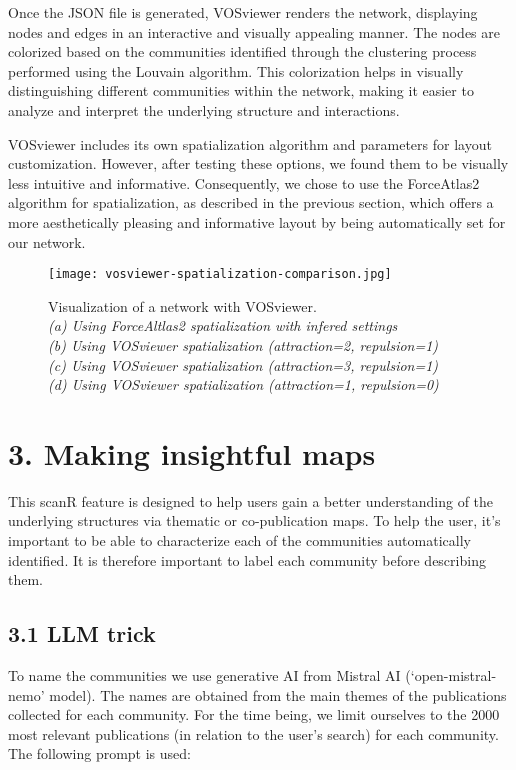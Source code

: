 \documentclass[
]{article}
\begin{document}
Once the JSON file is generated, VOSviewer renders the network,
displaying nodes and edges in an interactive and visually appealing
manner. The nodes are colorized based on the communities identified
through the clustering process performed using the Louvain algorithm.
This colorization helps in visually distinguishing different communities
within the network, making it easier to analyze and interpret the
underlying structure and interactions.

VOSviewer includes its own spatialization algorithm and parameters for
layout customization. However, after testing these options, we found
them to be visually less intuitive and informative. Consequently, we
chose to use the ForceAtlas2 algorithm for spatialization, as described
in the previous section, which offers a more aesthetically pleasing and
informative layout by being automatically set for our network.

\begin{figure}
\centering
\texttt{[image: vosviewer-spatialization-comparison.jpg]}
\caption{Visualization of a network with VOSviewer.\\
\emph{(a) Using ForceAltlas2 spatialization with infered settings\\
(b) Using VOSviewer spatialization (attraction=2, repulsion=1)\\
(c) Using VOSviewer spatialization (attraction=3, repulsion=1)\\
(d) Using VOSviewer spatialization (attraction=1, repulsion=0)}}
\end{figure}

\hypertarget{making-insightful-maps}{%
\section{3. Making insightful maps}\label{making-insightful-maps}}

This scanR feature is designed to help users gain a better understanding
of the underlying structures via thematic or co-publication maps. To
help the user, it's important to be able to characterize each of the
communities automatically identified. It is therefore important to label
each community before describing them.

\hypertarget{llm-trick}{%
\subsection{3.1 LLM trick}\label{llm-trick}}

To name the communities we use generative AI from Mistral AI
(`open-mistral-nemo' model). The names are obtained from the main themes
of the publications collected for each community. For the time being, we
limit ourselves to the 2000 most relevant publications (in relation to
the user's search) for each community. The following prompt is used:
\end{document}
